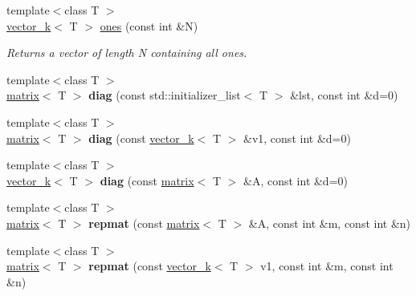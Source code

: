 \begin{DoxyCompactItemize}
{\footnotesize template$<$class T $>$ }\\\hyperlink{classkeycpp_1_1vector__k}{vector\-\_\-k}$<$ T $>$ \hyperlink{namespacekeycpp_af40d69ddd09826dae133a479cff545b0}{ones} (const int \&N)
\begin{DoxyCompactList}\small\item\em Returns a vector of length N containing all ones. \end{DoxyCompactList}\item 
\hypertarget{namespacekeycpp_a4bb3ea9a842383b82c889179f25be9ec}{{\footnotesize template$<$class T $>$ }\\\hyperlink{classkeycpp_1_1matrix}{matrix}$<$ T $>$ {\bfseries diag} (const std\-::initializer\-\_\-list$<$ T $>$ \&lst, const int \&d=0)}\label{namespacekeycpp_a4bb3ea9a842383b82c889179f25be9ec}

\item 
\hypertarget{namespacekeycpp_ae9ef181e938a4d835bb1cfb049479117}{{\footnotesize template$<$class T $>$ }\\\hyperlink{classkeycpp_1_1matrix}{matrix}$<$ T $>$ {\bfseries diag} (const \hyperlink{classkeycpp_1_1vector__k}{vector\-\_\-k}$<$ T $>$ \&v1, const int \&d=0)}\label{namespacekeycpp_ae9ef181e938a4d835bb1cfb049479117}

\item 
\hypertarget{namespacekeycpp_a282ba9ffa45fecd5880534415b116cc6}{{\footnotesize template$<$class T $>$ }\\\hyperlink{classkeycpp_1_1vector__k}{vector\-\_\-k}$<$ T $>$ {\bfseries diag} (const \hyperlink{classkeycpp_1_1matrix}{matrix}$<$ T $>$ \&A, const int \&d=0)}\label{namespacekeycpp_a282ba9ffa45fecd5880534415b116cc6}

\item 
\hypertarget{namespacekeycpp_ab56165975dd12a86b498134da71bde29}{{\footnotesize template$<$class T $>$ }\\\hyperlink{classkeycpp_1_1matrix}{matrix}$<$ T $>$ {\bfseries repmat} (const \hyperlink{classkeycpp_1_1matrix}{matrix}$<$ T $>$ \&A, const int \&m, const int \&n)}\label{namespacekeycpp_ab56165975dd12a86b498134da71bde29}

\item 
\hypertarget{namespacekeycpp_ab202ed201891fd28216e6d21599d5895}{{\footnotesize template$<$class T $>$ }\\\hyperlink{classkeycpp_1_1matrix}{matrix}$<$ T $>$ {\bfseries repmat} (const \hyperlink{classkeycpp_1_1vector__k}{vector\-\_\-k}$<$ T $>$ v1, const int \&m, const int \&n)}\label{namespacekeycpp_ab202ed201891fd28216e6d21599d5895}


\end{DoxyCompactItemize}
